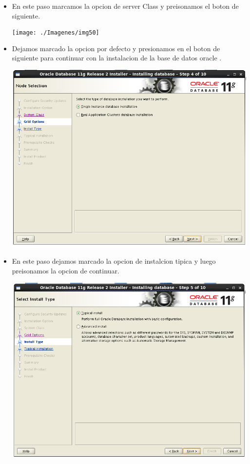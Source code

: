 \begin{itemize}
	\item En este paso marcamos la opcion de server Class y preisonamos el boton de siguiente.
	\begin{center}
	\texttt{[image: ./Imagenes/img50]} 
	\end{center}
	
\newpage

	\item Dejamos marcado la opcion por defecto y presionamos en el boton de siguiente para continuar con la instalacion de la base de datos oracle .
	\begin{center}
	\includegraphics[width=13cm]{./Imagenes/img51} 
	\end{center}
	
	\item En este paso dejamos marcado la opcion de instalcion tipica y luego preisonamos la opcion de continuar.
	\begin{center}
	\includegraphics[width=13cm]{./Imagenes/img52} 
	\end{center}
	

\end{itemize}
